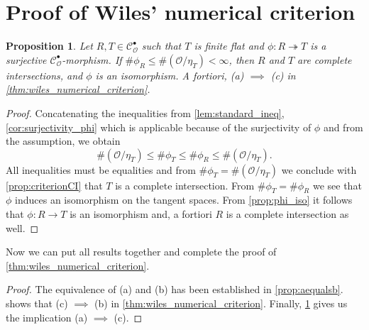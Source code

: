 \documentclass{article}
\theoremstyle{plain}%
\newtheorem{proposition}{Proposition}[section]
\theoremstyle{definition}
\theoremstyle{remark}
\newcommand{\cob}{\mathcal{C}_\mathcal{O}^\bullet}
\begin{document}
\section{Proof of Wiles' numerical criterion}

\begin{proposition}\cite[theorem 5.28]{darmon1995fermat}\label{prop:aimpliesc}
    Let \(R, T \in \cob\) such that \(T\) is finite flat and 
    \(\phi\colon R \twoheadrightarrow T\) is a surjective \(\cob\)-morphism.
    If \(\# \phi_R \leq \#(\mathcal{O}/\eta_T) < \infty\), then \(R\) and \(T\) are complete intersections,
    and \(\phi\) is an isomorphism.
    A fortiori, (a) \(\implies\) (c) in \cref{thm:wiles_numerical_criterion}.
\end{proposition}
\begin{proof}
    Concatenating the inequalities from \cref{lem:standard_ineq}, 
    \cref{cor:surjectivity_phi} which is applicable because of the surjectivity of \(\phi\)
    and from the assumption, we obtain
    \[
        \#(\mathcal{O}/\eta_T) \leq \#\phi_T \leq \#\phi_R \leq \#(\mathcal{O}/\eta_T).
    \]
    All inequalities must be equalities and from \(\#\phi_T = \#(\mathcal{O}/\eta_T)\)
    we conclude with \cref{prop:criterionCI} that \(T\) is a complete intersection.
    From \(\#\phi_T = \#\phi_R \) we see that \(\phi\) induces an isomorphism on the tangent spaces.
    From \cref{prop:phi_iso} it follows that \(\phi\colon R \to T\) is an isomorphism and, 
    a fortiori \(R\) is a complete intersection as well.
\end{proof}

Now we can put all results together and complete the proof of \cref{thm:wiles_numerical_criterion}.
\begin{proof}
    The equivalence of (a) and (b) has been established in \cref{prop:aequalsb}.
     shows that (c) \(\implies\) (b) in \cref{thm:wiles_numerical_criterion}.
    Finally, \cref{prop:aimpliesc} gives us the implication (a) \(\implies\) (c).
\end{proof}

\newpage
\printbibliography
\end{document}
